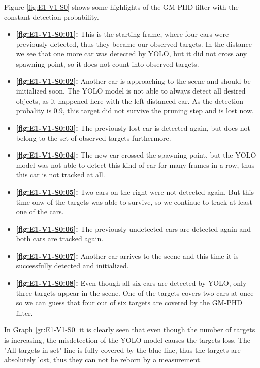 Figure \ref{fig:E1-V1-S0} shows some highlights of the GM-PHD filter with the constant detection probability.
\begin{itemize}
    \item \textbf{\ref{fig:E1-V1-S0:01}:} This is the starting frame, where four cars were previously detected, thus they became our observed targets. In the distance we see that one more car was detected by YOLO, but it did not cross any spawning point, so it does not count into observed targets.
    \item \textbf{\ref{fig:E1-V1-S0:02}:} Another car is approaching to the scene and should be initialized soon. The YOLO model is not able to always detect all desired objects, as it happened here with the left distanced car. As the detection probality is 0.9, this target did not survive the pruning step and is lost now.
    \item \textbf{\ref{fig:E1-V1-S0:03}:} The previously lost car is detected again, but does not belong to the set of observed targets furthermore.
    \item \textbf{\ref{fig:E1-V1-S0:04}:} The new car crossed the spawning point, but the YOLO model was not able to detect this kind of car for many frames in a row, thus this car is not tracked at all.
    \item \textbf{\ref{fig:E1-V1-S0:05}:} Two cars on the right were not detected again. But this time onw of the targets was able to survive, so we continue to track at least one of the cars.
    \item \textbf{\ref{fig:E1-V1-S0:06}:} The previously undetected cars are detected again and both cars are tracked again.
    \item \textbf{\ref{fig:E1-V1-S0:07}:} Another car arrives to the scene and this time it is successfully detected and initialized.
    \item \textbf{\ref{fig:E1-V1-S0:08}:} Even though all six cars are detected by YOLO, only three targets appear in the scene. One of the targets covers two cars at once so we can guess that four out of six targets are covered by the GM-PHD filter.
\end{itemize}

In Graph \ref{gr:E1-V1-S0} it is clearly seen that even though the number of targets is increasing, the misdetection of the YOLO model causes the targets loss. The "All targets in set" line is fully covered by the blue line, thus the targets are absolutely lost, thus they can not be reborn by a measurement.

